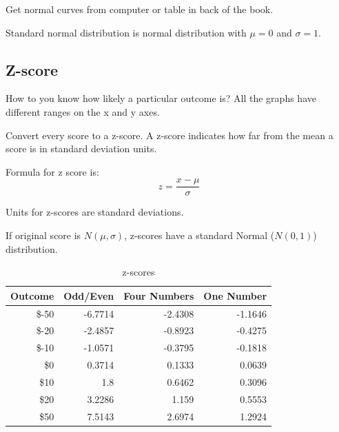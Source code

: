 \documentclass[landscape]{exam}
\begin{document}
  Get normal curves from computer or table in back of the book.

  Standard normal distribution is normal distribution with $\mu = 0$ and
  $\sigma = 1$.

  \subsection{Z-score}

  How to you know how likely a particular outcome is?  All the graphs have
  different ranges on the x and y axes.
  
  Convert every score to a z-score. A z-score indicates how far from the mean a
  score is in standard deviation units.

  Formula for z score is:
  \[
    z = \frac{x - \mu}{\sigma}
  \]

  Units for z-scores are standard deviations.

  If original score is $N(\mu, \sigma)$, z-scores have a standard Normal
  ($N(0, 1)$) distribution. 

  \begin{table}
    \centering
    \begin{tabular}[H]{rrrr}
      \toprule
      Outcome & Odd/Even & Four Numbers & One Number \\
      \midrule
      \$-50   & -6.7714  & -2.4308      & -1.1646 \\
      \$-20   & -2.4857  & -0.8923      & -0.4275 \\
      \$-10   & -1.0571  & -0.3795      & -0.1818 \\
      \$0     & 0.3714   & 0.1333       & 0.0639  \\
      \$10    & 1.8      & 0.6462       & 0.3096 \\
      \$20    & 3.2286   & 1.159        & 0.5553 \\
      \$50    & 7.5143   & 2.6974       & 1.2924 \\
      \bottomrule
    \end{tabular}
    \caption{z-scores}\label{tab:z-scores}
  \end{table}
\end{document}
